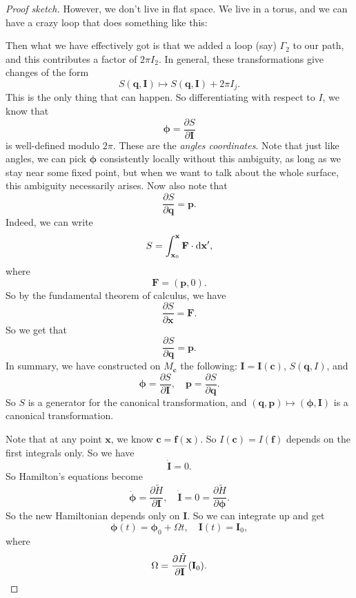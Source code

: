 \documentclass[a4paper]{article}
\begin{document}
\begin{proof}[Proof sketch]
  However, we don't live in flat space. We live in a torus, and we can have a crazy loop that does something like this:
  \begin{center}
  \end{center}
  Then what we have effectively got is that we added a loop (say) $\Gamma_2$ to our path, and this contributes a factor of $2\pi I_2$. In general, these transformations give changes of the form
  \[
    S(\mathbf{q}, \mathbf{I}) \mapsto S(\mathbf{q}, \mathbf{I}) + 2\pi I_j.
  \]
  This is the only thing that can happen. So differentiating with respect to $I$, we know that
  \[
    \boldsymbol\phi = \frac{\partial S}{\partial \mathbf{I}}
  \]
  is well-defined modulo $2\pi$. These are the \emph{angles coordinates}. Note that just like angles, we can pick $\boldsymbol\phi$ consistently locally without this ambiguity, as long as we stay near some fixed point, but when we want to talk about the whole surface, this ambiguity necessarily arises. Now also note that
  \[
    \frac{\partial S}{\partial \mathbf{q}} = \mathbf{p}.
  \]
  Indeed, we can write
  \[
    S = \int_{\mathbf{x}_0}^\mathbf{x} \mathbf{F} \cdot \mathrm{d} \mathbf{x}',
  \]
  where
  \[
    \mathbf{F} = (\mathbf{p}, 0).
  \]
  So by the fundamental theorem of calculus, we have
  \[
    \frac{\partial S}{\partial \mathbf{x}} = \mathbf{F}.
  \]
  So we get that
  \[
    \frac{\partial S}{\partial \mathbf{q}} = \mathbf{p}.
  \]
  In summary, we have constructed on $M_\mathbf{c}$ the following: $\mathbf{I}= \mathbf{I}(\mathbf{c})$, $S(\mathbf{q}, I)$, and
  \[
    \boldsymbol\phi = \frac{\partial S}{\partial \mathbf{I}},\quad \mathbf{p} = \frac{\partial S}{\partial \mathbf{q}}.
  \]
  So $S$ is a generator for the canonical transformation, and $(\mathbf{q}, \mathbf{p}) \mapsto (\boldsymbol\phi, \mathbf{I})$ is a canonical transformation.

  Note that at any point $\mathbf{x}$, we know $\mathbf{c} = \mathbf{f}(\mathbf{x})$. So $I(\mathbf{c}) = I(\mathbf{f})$ depends on the first integrals only. So we have
  \[
    \dot{\mathbf{I}} = 0.
  \]
  So Hamilton's equations become
  \[
    \dot{\boldsymbol\phi} = \frac{\partial \tilde{H}}{\partial \mathbf{I}},\quad \dot{\mathbf{I}} = 0 = \frac{\partial \tilde{H}}{\partial \boldsymbol\phi}.
  \]
  So the new Hamiltonian depends only on $\mathbf{I}$. So we can integrate up and get
  \[
    \boldsymbol\phi(t) = \boldsymbol\phi_0 + \Omega t,\quad \mathbf{I}(t) = \mathbf{I}_0,
  \]
  where
  \[
    \Omega = \frac{\partial\tilde{H}}{\partial \mathbf{I}}(\mathbf{I}_0).\qedhere
  \]
\end{proof}
\end{document}
